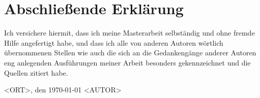 \section*{Abschließende Erklärung} 

Ich versichere hiermit, dass ich meine Masterarbeit selbständig und ohne fremde Hilfe angefertigt habe, und dass ich alle von anderen Autoren wörtlich übernommenen Stellen wie auch die sich an die Gedankengänge anderer Autoren eng anlegenden Ausführungen meiner Arbeit besonders gekennzeichnet und die Quellen zitiert habe.

\vspace*{3cm}
\noindent <ORT>, den \today \hspace*{2cm} <AUTOR>
